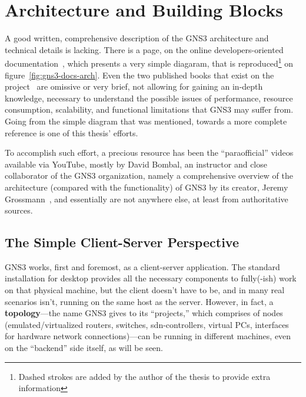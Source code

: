 \section{Architecture and Building Blocks}
\label{sec:gns3architecture}

A good written, comprehensive description of the GNS3 architecture and technical details is lacking.
There is a page, on the online developers-oriented documentation~\cite{gns3devarch}, which presents a very simple diagaram, that is reproduced\footnote{Dashed strokes are added by the author of the thesis to provide extra information} on figure~\ref{fig:gns3-docs-arch}.
Even the two published books that exist on the project~\cite{gns3netsimguide,thebookofgns3} are omissive or very brief, not allowing for gaining an in-depth knowledge, necessary to understand the possible issues of performance, resource consumption, scalability, and functional limitations that GNS3 may suffer from.
Going from the simple diagram that was mentioned, towards a more complete reference is one of this thesis' efforts.

To accomplish such effort, a precious resource has been the ``paraofficial'' videos available via YouTube, mostly by David Bombal, an instructor and close collaborator of the GNS3 organization, namely a comprehensive overview of the architecture (compared with the functionality) of GNS3 by its creator, Jeremy Grossmann~\cite{ytgns3arch22}, and essentially are not anywhere else, at least from authoritative sources. %



\subsection{The Simple Client-Server Perspective}
\label{subsec:gns3clientserver}

GNS3 works, first and foremost, as a client-server application.
The standard installation for desktop provides all the necessary components to fully(-ish) work on that physical machine, but the client doesn't have to be, and in many real scenarios isn't, running on the same host as the server.
However, in fact, a \textbf{topology}---the name GNS3 gives to its ``projects,'' which comprises of nodes (emulated/virtualized routers, switches, \gls{sdn}-controllers, virtual PCs, interfaces for hardware network connections)---can be running in different machines, even on the ``backend'' side itself, as will be seen.

